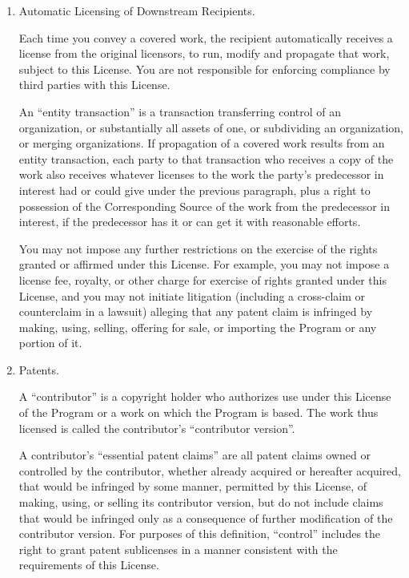 \documentclass[10pt,a4paper,ngerman,titlepage,tocindentauto]{article}
\begin{document}
\begin{multicols}{3}
{\begin{enumerate}
						\item Automatic Licensing of Downstream Recipients.

						Each time you convey a covered work, the recipient automatically
						receives a license from the original licensors, to run, modify and
						propagate that work, subject to this License.  You are not responsible
						for enforcing compliance by third parties with this License.

						An ``entity transaction'' is a transaction transferring control of an
						organization, or substantially all assets of one, or subdividing an
						organization, or merging organizations.  If propagation of a covered
						work results from an entity transaction, each party to that
						transaction who receives a copy of the work also receives whatever
						licenses to the work the party's predecessor in interest had or could
						give under the previous paragraph, plus a right to possession of the
						Corresponding Source of the work from the predecessor in interest, if
						the predecessor has it or can get it with reasonable efforts.

						You may not impose any further restrictions on the exercise of the
						rights granted or affirmed under this License.  For example, you may
						not impose a license fee, royalty, or other charge for exercise of
						rights granted under this License, and you may not initiate litigation
						(including a cross-claim or counterclaim in a lawsuit) alleging that
						any patent claim is infringed by making, using, selling, offering for
						sale, or importing the Program or any portion of it.

						\item Patents.

						A ``contributor'' is a copyright holder who authorizes use under this
						License of the Program or a work on which the Program is based.  The
						work thus licensed is called the contributor's ``contributor version''.

						A contributor's ``essential patent claims'' are all patent claims
						owned or controlled by the contributor, whether already acquired or
						hereafter acquired, that would be infringed by some manner, permitted
						by this License, of making, using, or selling its contributor version,
						but do not include claims that would be infringed only as a
						consequence of further modification of the contributor version.  For
						purposes of this definition, ``control'' includes the right to grant
						patent sublicenses in a manner consistent with the requirements of
						this License.


\end{enumerate}}
\end{multicols}
\end{document}
